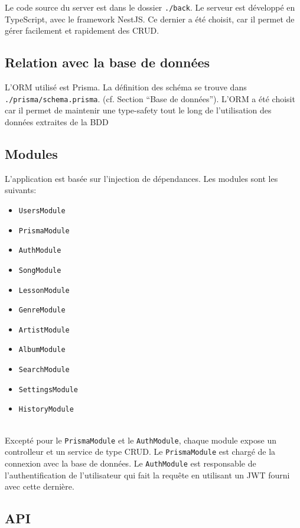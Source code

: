 Le code source du server est dans le dossier \texttt{./back}. Le serveur est développé en TypeScript, avec le framework NestJS. Ce dernier a été choisit, car il permet de gérer facilement et rapidement des CRUD.

\subsection*{Relation avec la base de données}
L’ORM utilisé est Prisma. La définition des schéma se trouve dans \texttt{./prisma/schema.prisma}. (cf. Section “Base de données”). L'ORM a été choisit car il permet de maintenir une type-safety tout le long de l'utilisation des données extraites de la BDD

\subsection*{Modules}
L’application est basée sur l'injection de dépendances. Les modules sont les suivants:

\begin{itemize}
	\item \texttt{UsersModule}
	\item \texttt{PrismaModule}
	\item \texttt{AuthModule}
	\item \texttt{SongModule}
	\item \texttt{LessonModule}
	\item \texttt{GenreModule}
	\item \texttt{ArtistModule}
	\item \texttt{AlbumModule}
	\item \texttt{SearchModule}
	\item \texttt{SettingsModule}
	\item \texttt{HistoryModule}
\end{itemize}
\  \\ %
Excepté pour le \texttt{PrismaModule} et le \texttt{AuthModule}, chaque module expose un controlleur et un service de type CRUD.
Le \texttt{PrismaModule} est chargé de la connexion avec la base de données. Le \texttt{AuthModule} est responsable de l'authentification de l’utilisateur qui fait la requête en utilisant un JWT fourni avec cette dernière.

\subsection*{API}

